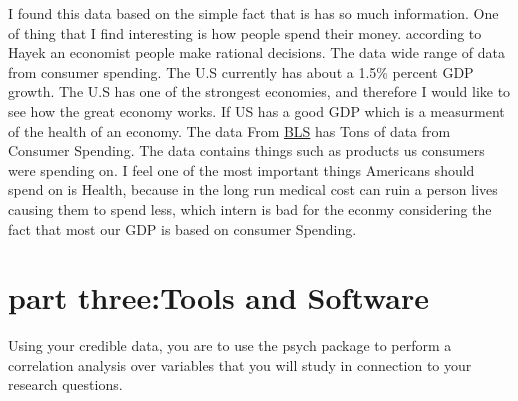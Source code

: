\documentclass[11pt]{article}
\begin{document}
I found this data based on the simple fact that is has so much information. One of thing that I find interesting  is how people spend their money. according to Hayek an economist people make rational decisions. The data wide range of data  from consumer spending. The U.S currently has about a 1.5\% percent GDP growth. The U.S has one of the strongest economies, and therefore I would like to see how the great economy works. If US has a good GDP which is a measurment of the health of an economy.  The data From \href{https://www.bls.gov/cex/csxstnd.htm#2010}{BLS} has Tons of data from Consumer Spending.  The data contains things such as products us consumers were spending on. I feel one of the most important things Americans should spend on is Health, because in the long run  medical cost can ruin a person lives causing them to spend less, which intern is bad for the econmy considering the fact that most our GDP is based on consumer Spending. 



\section{part three:Tools and Software}

Using your credible data, you are to use the psych package to perform a
correlation analysis over variables that you will study in connection to your research questions.
\end{document}
